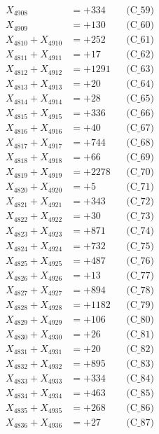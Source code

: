 \documentclass[a4paper,10pt]{article}
\begin{document}
{\begin{align}
X_{4908} &= +334 && \text{(C\_59)} \\
X_{4909} &= +130 && \text{(C\_60)} \\
\allowbreak
X_{4810} + X_{4910} &= +252 && \text{(C\_61)} \\
X_{4811} + X_{4911} &= +17 && \text{(C\_62)} \\
X_{4812} + X_{4912} &= +1291 && \text{(C\_63)} \\
X_{4813} + X_{4913} &= +20 && \text{(C\_64)} \\
X_{4814} + X_{4914} &= +28 && \text{(C\_65)} \\
\allowbreak
X_{4815} + X_{4915} &= +336 && \text{(C\_66)} \\
X_{4816} + X_{4916} &= +40 && \text{(C\_67)} \\
X_{4817} + X_{4917} &= +744 && \text{(C\_68)} \\
X_{4818} + X_{4918} &= +66 && \text{(C\_69)} \\
X_{4819} + X_{4919} &= +2278 && \text{(C\_70)} \\
\allowbreak
X_{4820} + X_{4920} &= +5 && \text{(C\_71)} \\
X_{4821} + X_{4921} &= +343 && \text{(C\_72)} \\
X_{4822} + X_{4922} &= +30 && \text{(C\_73)} \\
X_{4823} + X_{4923} &= +871 && \text{(C\_74)} \\
X_{4824} + X_{4924} &= +732 && \text{(C\_75)} \\
\allowbreak
X_{4825} + X_{4925} &= +487 && \text{(C\_76)} \\
X_{4826} + X_{4926} &= +13 && \text{(C\_77)} \\
X_{4827} + X_{4927} &= +894 && \text{(C\_78)} \\
X_{4828} + X_{4928} &= +1182 && \text{(C\_79)} \\
X_{4829} + X_{4929} &= +106 && \text{(C\_80)} \\
\allowbreak
X_{4830} + X_{4930} &= +26 && \text{(C\_81)} \\
X_{4831} + X_{4931} &= +20 && \text{(C\_82)} \\
X_{4832} + X_{4932} &= +895 && \text{(C\_83)} \\
X_{4833} + X_{4933} &= +334 && \text{(C\_84)} \\
X_{4834} + X_{4934} &= +463 && \text{(C\_85)} \\
\allowbreak
X_{4835} + X_{4935} &= +268 && \text{(C\_86)} \\
X_{4836} + X_{4936} &= +27 && \text{(C\_87)} \\

\end{align}}
\end{document}
